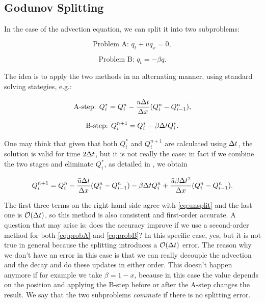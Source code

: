 \documentclass[journal,onecolumn]{IEEEtran}
\begin{document}
\subsection{Godunov Splitting}

In the case of the advection equation, we can split it into two subproblems:

\begin{equation}\label{eq:probA}
	\text{Problem A: } q_t+\bar{u}q_x=0,
\end{equation}

\begin{equation}\label{eq:probB}
	\text{Problem B: } q_t = -\beta q.
\end{equation}

The idea is to apply the two methods in an alternating manner, using standard solving stategies, e.g.:

\begin{equation}\label{eq:stepA}
	\text{A-step: } Q_i^* = Q_i^n - \frac{\bar{u}\Delta t}{\Delta x} (Q_i^n-Q_{i-1}^n),
\end{equation}

\begin{equation}\label{eq:stepB}
	\text{B-step: } Q_i^{n+1} = Q_i^*-\beta\Delta tQ_i^*.
\end{equation}

One may think that given that both $Q_i^*$ and $Q_i^{n+1}$ are calculated using $\Delta t$, the solution is valid for time $2\Delta t$, but it is not really the case: in fact if we combine the two stages and eliminate $Q_i^*$, as detailed in \cite{leveque}, we obtain

\begin{equation}
	Q_i^{n+1} = Q_i^n -\frac{\bar{u}\Delta t}{\Delta x}(Q_i^n-Q_{i-1}^n)-\beta\Delta tQ_i^n +\frac{\bar{u}\beta\Delta t^2}{\Delta x}(Q_i^n-Q_{i-1}^n).
\end{equation}

The first three terms on the right hand side agree with \eqref{eq:unsplit} and the last one is $\mathcal{O}(\Delta t)$, so this method is also consistent and first-order accurate. A question that may arise is: does the accuracy improve if we use a second-order method for both \eqref{eq:probA} and \eqref{eq:probB}? In this specific case, yes, but it is not true in general because the splitting introduces a $\mathcal{O}(\Delta t)$ error. The reason why we don't have an error in this case is that we can really decouple the advection and the decay and do these updates in either order. This doesn't happen anymore if for example we take $\beta = 1-x$, because in this case the value depends on the position and applying the B-step before or after the A-step changes the result. We say that the two subproblems \textit{commute} if there is no splitting error.
\end{document}
